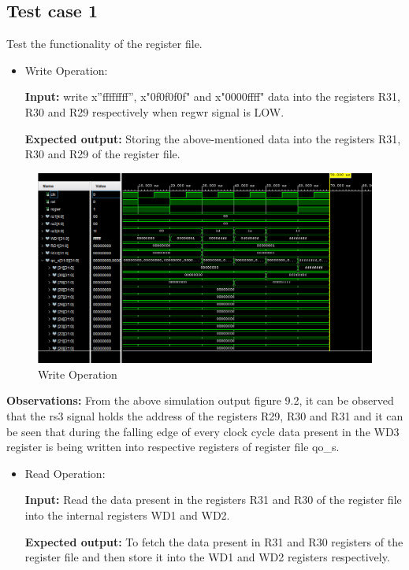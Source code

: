\subsection{Test case 1}
Test the functionality of the register file.

\begin{itemize}
    \item Write Operation:


\textbf{Input: }write x”ffffffff”, x"0f0f0f0f" and x"0000ffff" data into the registers R31, R30 and R29 respectively when regwr signal is LOW.

\textbf{Expected output: }Storing the above-mentioned data into the registers R31, R30 and R29 of the register file.
\end{itemize}
\vspace{2mm}

\begin{figure}[h]
    \centering
    \includegraphics[width=0.8\linewidth]{Image/WO2.png}
    \caption{Write Operation}
    \label{fig:enter-label}
\end{figure}
\vspace{2mm}

\textbf{Observations:} From the above simulation output figure 9.2, it can be observed that the rs3 signal holds the address of the registers R29, R30 and R31 and it can be seen that during the falling edge of every clock cycle data present in the WD3 register is being written into respective registers of register file qo\_s.
\newpage
\begin{itemize}
    \item Read Operation:

\textbf{Input:} Read the data present in the registers R31 and R30 of the register file into the internal registers WD1 and WD2.

\textbf{Expected output:} To fetch the data present in R31 and R30 registers of the register file and then store it into the WD1 and WD2 registers respectively.
\end{itemize}

